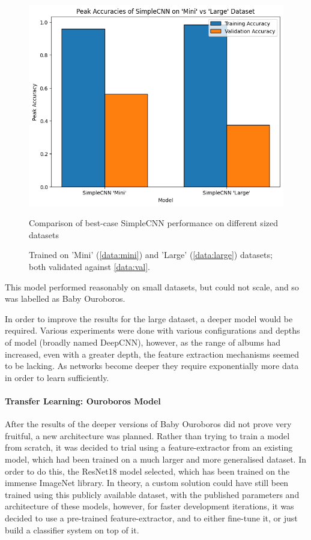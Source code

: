                 \begin{figure}[h]
                    \centering
                    \includegraphics[width=\textwidth]{images/SimpleCNNs_PeakAccuracy.png}
                    \caption{Comparison of best-case SimpleCNN performance on different sized datasets}
                    \label{fig:SimpleCNNs_PeakAccuracy-Mini_Train}
                    \caption*{Trained on 'Mini' (\ref{data:mini}) and 'Large' (\ref{data:large}) datasets; both validated against \ref{data:val}.}
                \end{figure}
    
                This model performed reasonably on small datasets, but could not scale, and so was labelled as Baby Ouroboros.
    
                In order to improve the results for the large dataset, a deeper model would be required. Various experiments were done with various configurations and depths of model (broadly named DeepCNN), however, as the range of albums had increased, even with a greater depth, the feature extraction mechanisms seemed to be lacking. As networks become deeper they require exponentially more data in order to learn sufficiently.
    
                \paragraph{Transfer Learning: Ouroboros Model}
    
                After the results of the deeper versions of Baby Ouroboros did not prove very fruitful, a new architecture was planned. Rather than trying to train a model from scratch, it was decided to trial using a feature-extractor from an existing model, which had been trained on a much larger and more generalised dataset. In order to do this, the ResNet18 model selected, which has been trained on the immense ImageNet library. In theory, a custom solution could have still been trained using this publicly available dataset, with the published parameters and architecture of these models, however, for faster development iterations, it was decided to use a pre-trained feature-extractor, and to either fine-tune it, or just build a classifier system on top of it.
    
